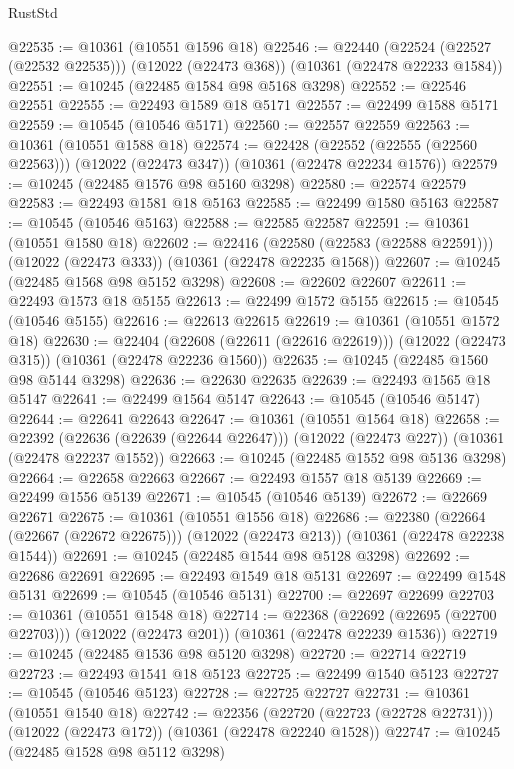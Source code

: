 \begin{lexlean}{RustStd}
\begin{coremodule}
@22535 := @10361 (@10551 @1596 @18)
@22546 := @22440
    (@22524 (@22527 (@22532 @22535)))
    (@12022 (@22473 @368))
    (@10361 (@22478 @22233 @1584))
@22551 := @10245 (@22485 @1584 @98 @5168 @3298)
@22552 := @22546 @22551
@22555 := @22493 @1589 @18 @5171
@22557 := @22499 @1588 @5171
@22559 := @10545 (@10546 @5171)
@22560 := @22557 @22559
@22563 := @10361 (@10551 @1588 @18)
@22574 := @22428
    (@22552 (@22555 (@22560 @22563)))
    (@12022 (@22473 @347))
    (@10361 (@22478 @22234 @1576))
@22579 := @10245 (@22485 @1576 @98 @5160 @3298)
@22580 := @22574 @22579
@22583 := @22493 @1581 @18 @5163
@22585 := @22499 @1580 @5163
@22587 := @10545 (@10546 @5163)
@22588 := @22585 @22587
@22591 := @10361 (@10551 @1580 @18)
@22602 := @22416
    (@22580 (@22583 (@22588 @22591)))
    (@12022 (@22473 @333))
    (@10361 (@22478 @22235 @1568))
@22607 := @10245 (@22485 @1568 @98 @5152 @3298)
@22608 := @22602 @22607
@22611 := @22493 @1573 @18 @5155
@22613 := @22499 @1572 @5155
@22615 := @10545 (@10546 @5155)
@22616 := @22613 @22615
@22619 := @10361 (@10551 @1572 @18)
@22630 := @22404
    (@22608 (@22611 (@22616 @22619)))
    (@12022 (@22473 @315))
    (@10361 (@22478 @22236 @1560))
@22635 := @10245 (@22485 @1560 @98 @5144 @3298)
@22636 := @22630 @22635
@22639 := @22493 @1565 @18 @5147
@22641 := @22499 @1564 @5147
@22643 := @10545 (@10546 @5147)
@22644 := @22641 @22643
@22647 := @10361 (@10551 @1564 @18)
@22658 := @22392
    (@22636 (@22639 (@22644 @22647)))
    (@12022 (@22473 @227))
    (@10361 (@22478 @22237 @1552))
@22663 := @10245 (@22485 @1552 @98 @5136 @3298)
@22664 := @22658 @22663
@22667 := @22493 @1557 @18 @5139
@22669 := @22499 @1556 @5139
@22671 := @10545 (@10546 @5139)
@22672 := @22669 @22671
@22675 := @10361 (@10551 @1556 @18)
@22686 := @22380
    (@22664 (@22667 (@22672 @22675)))
    (@12022 (@22473 @213))
    (@10361 (@22478 @22238 @1544))
@22691 := @10245 (@22485 @1544 @98 @5128 @3298)
@22692 := @22686 @22691
@22695 := @22493 @1549 @18 @5131
@22697 := @22499 @1548 @5131
@22699 := @10545 (@10546 @5131)
@22700 := @22697 @22699
@22703 := @10361 (@10551 @1548 @18)
@22714 := @22368
    (@22692 (@22695 (@22700 @22703)))
    (@12022 (@22473 @201))
    (@10361 (@22478 @22239 @1536))
@22719 := @10245 (@22485 @1536 @98 @5120 @3298)
@22720 := @22714 @22719
@22723 := @22493 @1541 @18 @5123
@22725 := @22499 @1540 @5123
@22727 := @10545 (@10546 @5123)
@22728 := @22725 @22727
@22731 := @10361 (@10551 @1540 @18)
@22742 := @22356
    (@22720 (@22723 (@22728 @22731)))
    (@12022 (@22473 @172))
    (@10361 (@22478 @22240 @1528))
@22747 := @10245 (@22485 @1528 @98 @5112 @3298)

\end{coremodule}
\end{lexlean}
